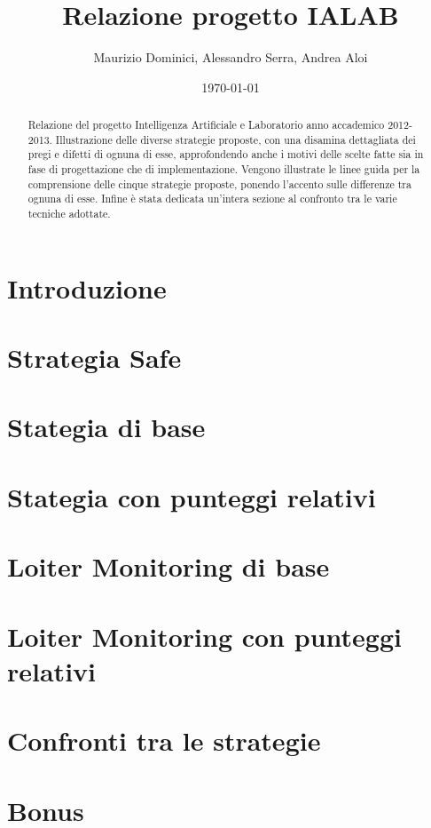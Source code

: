 \documentclass[a4paper,12pt, twoside]{report}
\title{Relazione progetto IALAB}
\author{Maurizio Dominici, Alessandro Serra, Andrea Aloi}
\date{\today}
\begin{document}
\maketitle
 
\begin{abstract}
Relazione del progetto Intelligenza Artificiale e Laboratorio anno accademico 2012-2013.
Illustrazione delle diverse strategie proposte, con una disamina dettagliata dei pregi e difetti di ognuna di esse, approfondendo anche i motivi delle scelte fatte sia in fase di progettazione che di implementazione. Vengono illustrate le linee guida per la comprensione delle cinque strategie proposte, ponendo l'accento sulle differenze tra ognuna di esse. Infine è stata dedicata un'intera sezione al confronto tra le varie tecniche adottate.
\end{abstract}

\newpage
 
\tableofcontents
\clearpage{\pagestyle{empty}\cleardoublepage}

\chapter{Introduzione} \label{cap:intro}


\chapter{Strategia Safe} \label{cap:safe}


\chapter{Stategia di base} \label{cap:base}


\chapter{Stategia con punteggi relativi} \label{cap:rel}


\chapter{Loiter Monitoring di base} \label{cap:loiter-base}


\chapter{Loiter Monitoring con punteggi relativi} \label{cap:loiter-rel}


\chapter{Confronti tra le strategie} \label{cap:confronti}


\chapter{Bonus} \label{cap:bonus}

%
\end{document}
